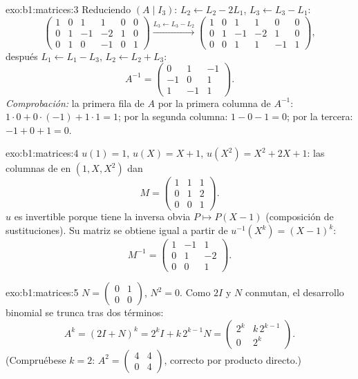 \begin{solution}{exo:b1:matrices:3}
Reduciendo $(A \mid I_3)$: $L_2 \leftarrow L_2 - 2L_1$,
$L_3 \leftarrow L_3 - L_1$:
\[
\begin{pmatrix}
1 & 0 & 1 & 1 & 0 & 0\\
0 & 1 & -1 & -2 & 1 & 0\\
0 & 1 & 0 & -1 & 0 & 1
\end{pmatrix}
\xrightarrow{L_3 \leftarrow L_3 - L_2}
\begin{pmatrix}
1 & 0 & 1 & 1 & 0 & 0\\
0 & 1 & -1 & -2 & 1 & 0\\
0 & 0 & 1 & 1 & -1 & 1
\end{pmatrix},
\]
después $L_1 \leftarrow L_1 - L_3$, $L_2 \leftarrow L_2 + L_3$:
\[
A^{-1} = \begin{pmatrix}
0 & 1 & -1\\
-1 & 0 & 1\\
1 & -1 & 1
\end{pmatrix}.
\]
\emph{Comprobación:} la primera fila de $A$ por la primera columna de
$A^{-1}$: $1 \cdot 0 + 0\cdot(-1) + 1\cdot 1 = 1$; por la segunda
columna: $1 - 0 - 1 = 0$; por la tercera: $-1 + 0 + 1 = 0$.
\end{solution}

\begin{solution}{exo:b1:matrices:4}
$u(1) = 1$, $u(X) = X + 1$, $u(X^2) = X^2 + 2X + 1$: las columnas de
 en $(1, X, X^2)$ dan
\[
M = \begin{pmatrix}
1 & 1 & 1\\
0 & 1 & 2\\
0 & 0 & 1
\end{pmatrix}.
\]
$u$ es invertible porque tiene la inversa obvia $P \mapsto P(X - 1)$
(composición de sustituciones). Su matriz se obtiene igual a partir
de $u^{-1}(X^k) = (X-1)^k$:
\[
M^{-1} = \begin{pmatrix}
1 & -1 & 1\\
0 & 1 & -2\\
0 & 0 & 1
\end{pmatrix}.
\]
\end{solution}

\begin{solution}{exo:b1:matrices:5}
$N = \begin{pmatrix} 0 & 1\\ 0 & 0\end{pmatrix}$, $N^2 = 0$. Como
$2I$ y $N$ conmutan, el desarrollo binomial se trunca tras dos
términos:
\[
A^k = (2I + N)^k = 2^k I + k\,2^{k-1} N
= \begin{pmatrix} 2^k & k\,2^{k-1}\\ 0 & 2^k\end{pmatrix}.
\]
(Compruébese $k = 2$:
$A^2 = \begin{pmatrix}4 & 4\\ 0 & 4\end{pmatrix}$, correcto por
producto directo.)
\end{solution}

